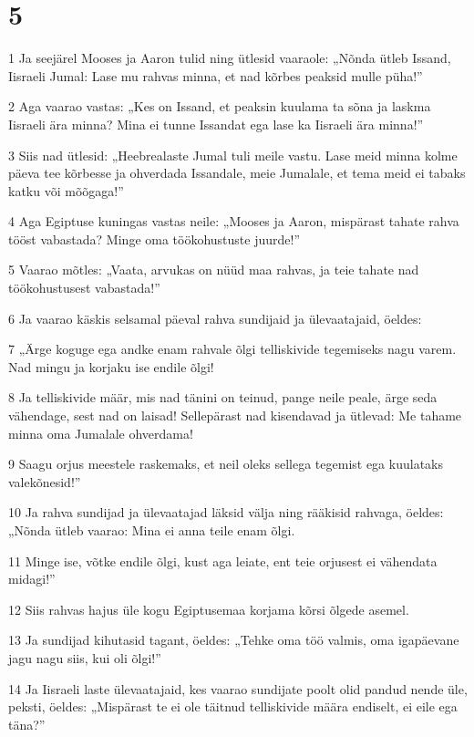\chapter{5}

\par 1 Ja seejärel Mooses ja Aaron tulid ning ütlesid vaaraole: „Nõnda ütleb Issand, Iisraeli Jumal: Lase mu rahvas minna, et nad kõrbes peaksid mulle püha!”
\par 2 Aga vaarao vastas: „Kes on Issand, et peaksin kuulama ta sõna ja laskma Iisraeli ära minna? Mina ei tunne Issandat ega lase ka Iisraeli ära minna!”
\par 3 Siis nad ütlesid: „Heebrealaste Jumal tuli meile vastu. Lase meid minna kolme päeva tee kõrbesse ja ohverdada Issandale, meie Jumalale, et tema meid ei tabaks katku või mõõgaga!”
\par 4 Aga Egiptuse kuningas vastas neile: „Mooses ja Aaron, mispärast tahate rahva tööst vabastada? Minge oma töökohustuste juurde!”
\par 5 Vaarao mõtles: „Vaata, arvukas on nüüd maa rahvas, ja teie tahate nad töökohustusest vabastada!”
\par 6 Ja vaarao käskis selsamal päeval rahva sundijaid ja ülevaatajaid, öeldes:
\par 7 „Ärge koguge ega andke enam rahvale õlgi telliskivide tegemiseks nagu varem. Nad mingu ja korjaku ise endile õlgi!
\par 8 Ja telliskivide määr, mis nad tänini on teinud, pange neile peale, ärge seda vähendage, sest nad on laisad! Sellepärast nad kisendavad ja ütlevad: Me tahame minna oma Jumalale ohverdama!
\par 9 Saagu orjus meestele raskemaks, et neil oleks sellega tegemist ega kuulataks valekõnesid!”
\par 10 Ja rahva sundijad ja ülevaatajad läksid välja ning rääkisid rahvaga, öeldes: „Nõnda ütleb vaarao: Mina ei anna teile enam õlgi.
\par 11 Minge ise, võtke endile õlgi, kust aga leiate, ent teie orjusest ei vähendata midagi!”
\par 12 Siis rahvas hajus üle kogu Egiptusemaa korjama kõrsi õlgede asemel.
\par 13 Ja sundijad kihutasid tagant, öeldes: „Tehke oma töö valmis, oma igapäevane jagu nagu siis, kui oli õlgi!”
\par 14 Ja Iisraeli laste ülevaatajaid, kes vaarao sundijate poolt olid pandud nende üle, peksti, öeldes: „Mispärast te ei ole täitnud telliskivide määra endiselt, ei eile ega täna?”
